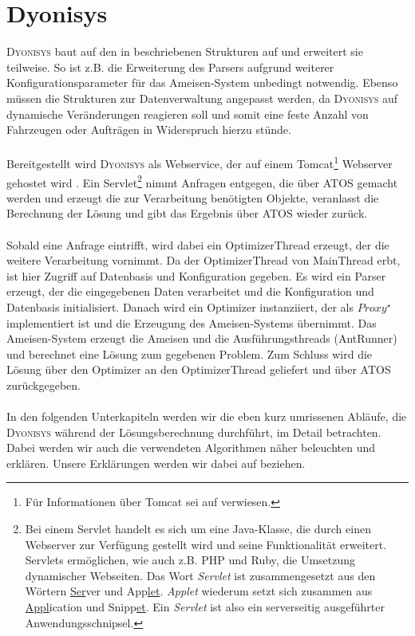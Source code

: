 \section{Dyonisys}
\textsc{Dyonisys} baut auf den in  beschriebenen Strukturen auf und erweitert sie teilweise. So ist z.B. die Erweiterung des Parsers aufgrund weiterer Konfigurationsparameter für das Ameisen-System unbedingt notwendig. Ebenso müssen die Strukturen zur Datenverwaltung angepasst werden, da \textsc{Dyonisys} auf dynamische Veränderungen reagieren soll und somit eine feste Anzahl von Fahrzeugen oder Aufträgen in Widerspruch hierzu stünde. \\
\\
Bereitgestellt wird \textsc{Dyonisys} als Webservice, der auf einem \textsf{Tomcat}\footnote{Für Informationen über \textsf{Tomcat} sei auf \cite{tomcat} verwiesen.} Webserver gehostet wird \cite{tomcat}. Ein Servlet\footnote{Bei einem Servlet handelt es sich um eine Java-Klasse, die durch einen Webserver zur Verfügung gestellt wird und seine Funktionalität erweitert. Servlets ermöglichen, wie auch z.B. \textsf{PHP} und \textsf{Ruby}, die Umsetzung dynamischer Webseiten. Das Wort \emph{Servlet} ist zusammengesetzt aus den Wörtern \underline{Ser}ver und App\underline{let}. \emph{Applet} wiederum setzt sich zusammen aus \underline{Appl}ication und Snipp\underline{et}. Ein \emph{Servlet} ist also ein serverseitig ausgeführter Anwendungsschnipsel.} nimmt Anfragen entgegen, die über \textsc{ATOS} gemacht werden und erzeugt die zur Verarbeitung benötigten Objekte, veranlasst die Berechnung der Lösung und gibt das Ergebnis über \textsc{ATOS} wieder zurück. \\
\\
Sobald eine Anfrage eintrifft, wird dabei ein \textsf{OptimizerThread} erzeugt, der die weitere Verarbeitung vornimmt. Da der \textsf{OptimizerThread} von \textsf{MainThread} erbt, ist hier Zugriff auf Datenbasis und Konfiguration gegeben. Es wird ein Parser erzeugt, der die eingegebenen Daten verarbeitet und die Konfiguration und Datenbasis initialisiert. Danach wird ein \textsf{Optimizer} instanziiert, der als $Proxy^\star$ implementiert ist und die Erzeugung des Ameisen-Systems übernimmt. Das Ameisen-System erzeugt die Ameisen und die Ausführungsthreads (\textsf{AntRunner}) und berechnet eine Lösung zum gegebenen Problem. Zum Schluss wird die Lösung über den \textsf{Optimizer} an den \textsf{OptimizerThread} geliefert und über \textsc{ATOS} zurückgegeben. \\
\\
In den folgenden Unterkapiteln werden wir die eben kurz umrissenen Abläufe, die \textsc{Dyonisys} während der Lösungsberechnung durchführt, im Detail betrachten. Dabei werden wir auch die verwendeten Algorithmen näher beleuchten und erklären. Unsere Erklärungen werden wir dabei auf  beziehen.

